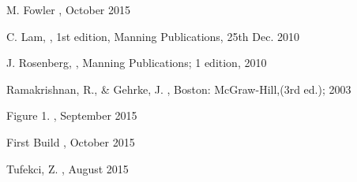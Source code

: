 \documentclass[a4paper, 11pt]{article}
\begin{document}
\begin{thebibliography}{29}
M. Fowler \emph{}, October 2015
\vspace{\baselineskip}

C. Lam, \emph{}, 1st edition, Manning Publications, 25th Dec. 2010
\vspace{\baselineskip}

J. Rosenberg, \emph{}, Manning Publications; 1 edition, 2010
\vspace{\baselineskip}

Ramakrishnan, R., \& Gehrke, J. \emph{}, Boston: McGraw-Hill,(3rd ed.); 2003
\vspace{\baselineskip}

Figure 1. \emph{}, September 2015
\vspace{\baselineskip}

First Build \emph{}, October 2015
\vspace{\baselineskip}

Tufekci, Z. \emph{}, August 2015
\vspace{\baselineskip}

\end{thebibliography}
\end{document}

